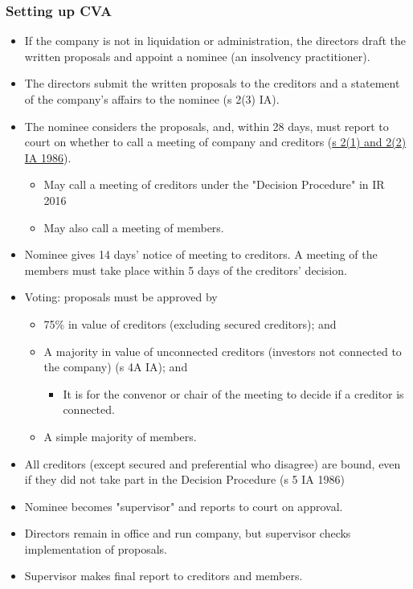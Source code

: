 \documentclass[
]{article}
\providecommand{\tightlist}{%
  \setlength{\itemsep}{0pt}\setlength{\parskip}{0pt}}
\begin{document}
\hypertarget{setting-up-cva}{%
\subsubsection{Setting up CVA}\label{setting-up-cva}}

\begin{itemize}
\tightlist
\item
  If the company is not in liquidation or administration, the directors
  draft the written proposals and appoint a nominee (an insolvency
  practitioner).
\item
  The directors submit the written proposals to the creditors and a
  statement of the company's affairs to the nominee (s 2(3) IA).
\item
  The nominee considers the proposals, and, within 28 days, must report
  to court on whether to call a meeting of company and creditors
  (\href{https://www.legislation.gov.uk/ukpga/1986/45/section/2}{s 2(1)
  and 2(2) IA 1986}).

  \begin{itemize}
  \tightlist
  \item
    May call a meeting of creditors under the "Decision Procedure" in IR
    2016
  \item
    May also call a meeting of members.
  \end{itemize}
\item
  Nominee gives 14 days' notice of meeting to creditors. A meeting of
  the members must take place within 5 days of the creditors' decision.
\item
  Voting: proposals must be approved by

  \begin{itemize}
  \tightlist
  \item
    75\% in value of creditors (excluding secured creditors); and
  \item
    A majority in value of unconnected creditors (investors not
    connected to the company) (s 4A IA); and

    \begin{itemize}
    \tightlist
    \item
      It is for the convenor or chair of the meeting to decide if a
      creditor is connected.
    \end{itemize}
  \item
    A simple majority of members.
  \end{itemize}
\item
  All creditors (except secured and preferential who disagree) are
  bound, even if they did not take part in the Decision Procedure (s 5
  IA 1986)
\item
  Nominee becomes "supervisor" and reports to court on approval.
\item
  Directors remain in office and run company, but supervisor checks
  implementation of proposals.
\item
  Supervisor makes final report to creditors and members.
\end{itemize}
\end{document}

